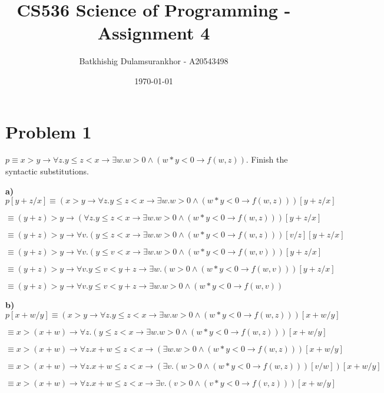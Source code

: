 \documentclass{article}
\title{CS536 Science of Programming - Assignment 4}
\author{Batkhishig Dulamsurankhor - A20543498}
\date{\today} %
\begin{document}
\maketitle


\section*{Problem 1}

$ p \equiv x>y \rightarrow \forall z.y \leq z < x \rightarrow \exists w.w>0 \wedge (w*y<0 \rightarrow f(w,z)) $. Finish the syntactic substitutions.
\vspace{10pt}

\textbf{a)} $ p[y+z/x] \equiv (x>y \rightarrow \forall z.y \leq z < x \rightarrow \exists w.w>0 \wedge (w*y<0 \rightarrow f(w,z)))[y+z/x]$

\qquad \qquad \qquad  $ \equiv (y+z)>y \rightarrow (\forall z.y \leq z < x \rightarrow \exists w.w>0 \wedge (w*y<0 \rightarrow f(w,z)))[y+z/x]$

\qquad \qquad \qquad  $ \equiv (y+z)>y \rightarrow \forall v.(y \leq z < x \rightarrow \exists w.w>0 \wedge (w*y<0 \rightarrow f(w,z)))[v/z][y+z/x]$

\qquad \qquad \qquad  $ \equiv (y+z)>y \rightarrow \forall v.(y \leq v < x \rightarrow \exists w.w>0 \wedge (w*y<0 \rightarrow f(w,v)))[y+z/x]$

\qquad \qquad \qquad  $ \equiv (y+z)>y \rightarrow \forall v.y \leq v < y+z \rightarrow \exists w.(w>0 \wedge (w*y<0 \rightarrow f(w,v)))[y+z/x]$

\qquad \qquad \qquad  $ \equiv (y+z)>y \rightarrow \forall v.y \leq v < y+z \rightarrow \exists w.w>0 \wedge (w*y<0 \rightarrow f(w,v))$

\vspace{10pt}
\textbf{b)} $ p[x+w/y] \equiv (x>y \rightarrow \forall z.y \leq z < x \rightarrow \exists w.w>0 \wedge (w*y<0 \rightarrow f(w,z)))[x+w/y]$

\qquad \qquad \qquad  $ \equiv x>(x+w) \rightarrow \forall z.(y \leq z < x \rightarrow \exists w.w>0 \wedge (w*y<0 \rightarrow f(w,z)))[x+w/y]$

\qquad \qquad \qquad  $ \equiv x>(x+w) \rightarrow \forall z.x+w \leq z < x \rightarrow (\exists w.w>0 \wedge (w*y<0 \rightarrow f(w,z)))[x+w/y]$

\qquad \qquad \qquad  $ \equiv x>(x+w) \rightarrow \forall z.x+w \leq z < x \rightarrow (\exists v.(w>0 \wedge (w*y<0 \rightarrow f(w,z)))[v/w])[x+w/y]$

\qquad \qquad \qquad  $ \equiv x>(x+w) \rightarrow \forall z.x+w \leq z < x \rightarrow \exists v.(v>0 \wedge (v*y<0 \rightarrow f(v,z)))[x+w/y]$
\end{document}
